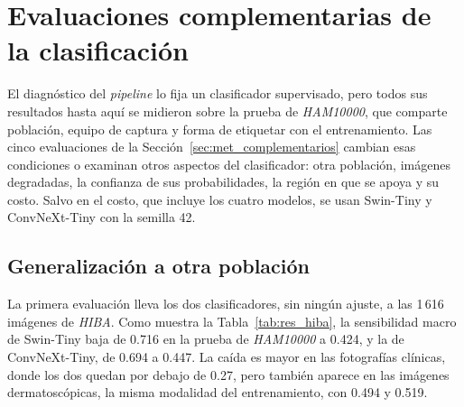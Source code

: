 \section{Evaluaciones complementarias de la clasificación}
\label{sec:res_complementarios}

El diagnóstico del \emph{pipeline} lo fija un clasificador supervisado, pero todos sus resultados hasta aquí se
midieron sobre la prueba de \emph{HAM10000}, que comparte población, equipo de captura y forma de etiquetar con el
entrenamiento. Las cinco evaluaciones de la Sección~\ref{sec:met_complementarios} cambian esas condiciones o examinan
otros aspectos del clasificador: otra población, imágenes degradadas, la confianza de sus probabilidades, la región en
que se apoya y su costo. Salvo en el costo, que incluye los cuatro modelos, se usan Swin-Tiny y ConvNeXt-Tiny con la
semilla 42.

\subsection{Generalización a otra población}
\label{sec:res_hiba}

La primera evaluación lleva los dos clasificadores, sin ningún ajuste, a las 1\,616 imágenes de \emph{HIBA}. Como
muestra la Tabla~\ref{tab:res_hiba}, la sensibilidad macro de Swin-Tiny baja de 0.716 en la prueba de \emph{HAM10000} a
0.424, y la de ConvNeXt-Tiny, de 0.694 a 0.447. La caída es mayor en las fotografías clínicas, donde los dos quedan
por debajo de 0.27, pero también aparece en las imágenes dermatoscópicas, la misma modalidad del entrenamiento, con
0.494 y 0.519.

